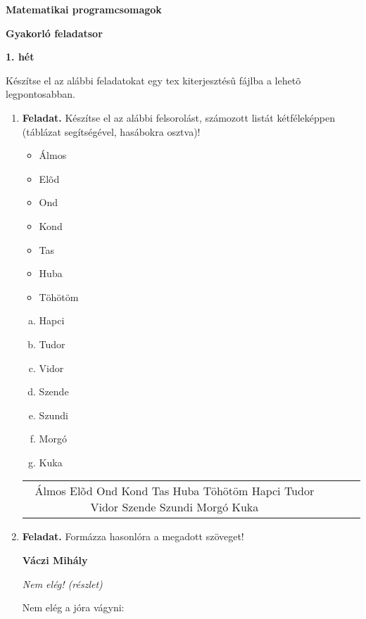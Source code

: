 \documentclass[12pt,a4paper]{article}
\begin{document}
\pagestyle{empty}
\noindent

\begin{center}
    \textbf{Matematikai programcsomagok}
    \par
    \textbf{Gyakorló feladatsor}
    \par
    \textbf{1. hét}
    \par
\end{center}

Készítse el az alábbi feladatokat egy tex kiterjesztésû fájlba a lehetõ legpontosabban.
\par
\begin{enumerate}
    \item
          \textbf{Feladat.}
          Készítse el az alábbi felsorolást, számozott listát kétféleképpen (táblázat segítségével, hasábokra osztva)!
          \begin{multicols}{2}
              \begin{itemize}
                  \item Álmos
                  \item Elõd
                  \item Ond
                  \item Kond
                  \item Tas
                  \item Huba
                  \item Töhötöm
              \end{itemize}
              \begin{enumerate}[a.)]
                  \item Hapci
                  \item Tudor
                  \item Vidor
                  \item Szende
                  \item Szundi
                  \item Morgó
                  \item Kuka
              \end{enumerate}
          \end{multicols}
          \begin{tabular}{|c|rrr}
              Álmos
              Elõd
              Ond
              Kond
              Tas
              Huba
              Töhötöm
              Hapci
              Tudor
              Vidor
              Szende
              Szundi
              Morgó
              Kuka
          \end{tabular}
    \item
          \textbf{Feladat.} Formázza hasonlóra a megadott szöveget!
          \begin{center}
              \Large
              \textbf{Váczi Mihály}
              \par
              \large
              \textit{Nem elég! (részlet)}
              \par
              \normalsize Nem elég a jóra vágyni: \par


\end{center}
\end{enumerate}
\end{document}
